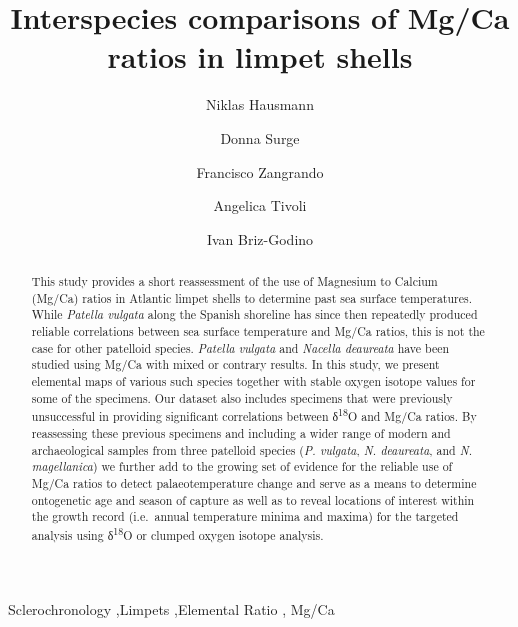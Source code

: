 \documentclass[
  authoryear,
  preprint,
  3p]{elsarticle}
\begin{document}
\begin{frontmatter}
\title{Interspecies comparisons of Mg/Ca ratios in limpet shells}
\author[1]{Niklas Hausmann%
%
}
\author[2]{Donna Surge%
%
}

\author[3]{Francisco Zangrando%
%
}

\author[3]{Angelica Tivoli%
%
}

\author[4]{Ivan Briz-Godino%
%
}








        
\begin{abstract}
This study provides a short reassessment of the use of Magnesium to
Calcium (Mg/Ca) ratios in Atlantic limpet shells to determine past sea
surface temperatures. While \emph{Patella vulgata} along the Spanish
shoreline has since then repeatedly produced reliable correlations
between sea surface temperature and Mg/Ca ratios, this is not the case
for other patelloid species. \emph{Patella vulgata} and \emph{Nacella
deaureata} have been studied using Mg/Ca with mixed or contrary results.
In this study, we present elemental maps of various such species
together with stable oxygen isotope values for some of the specimens.
Our dataset also includes specimens that were previously unsuccessful in
providing significant correlations between δ\textsuperscript{18}O and
Mg/Ca ratios. By reassessing these previous specimens and including a
wider range of modern and archaeological samples from three patelloid
species (\emph{P. vulgata}, \emph{N. deaureata}, and \emph{N.
magellanica}) we further add to the growing set of evidence for the
reliable use of Mg/Ca ratios to detect palaeotemperature change and
serve as a means to determine ontogenetic age and season of capture as
well as to reveal locations of interest within the growth record
(i.e.~annual temperature minima and maxima) for the targeted analysis
using δ\textsuperscript{18}O or clumped oxygen isotope analysis.
\end{abstract}





\begin{keyword}
    Sclerochronology \sep Limpets \sep Elemental Ratio \sep 
    Mg/Ca
\end{keyword}
\end{frontmatter}
    
\end{document}
